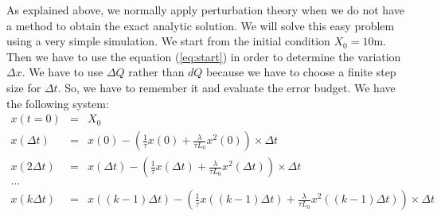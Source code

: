 \documentclass[a4paper,10pt]{article}
\begin{document}
As explained above, we normally apply perturbation theory when we do not have a method to obtain the exact analytic solution. We will solve this easy problem using a very simple simulation. We start from the initial condition $X_0=10$m. Then we have to use the equation (\ref{eq:start}) in order to determine the variation $\Delta x$. We have to use $\Delta Q$ rather than $dQ$ because we have to choose a finite step size for $\Delta t$. So, we have to remember it and evaluate the error budget. We have the following system:
\begin{eqnarray}
x(t=0) &=& X_0\\
x(\Delta t) &=& x(0) - \left(  \frac{1}{\tau}x(0) + \frac{\lambda}{\tau L_0}x^2(0) \right)\times \Delta t\\
x(2\Delta t) &=& x(\Delta t) - \left(  \frac{1}{\tau}x(\Delta t) + \frac{\lambda}{\tau L_0}x^2(\Delta t) \right)\times \Delta t\\
\ldots \\
x(k\Delta t) &=& x( (k-1)\Delta t) - \left(  \frac{1}{\tau}x((k-1)\Delta t) + \frac{\lambda}{\tau L_0}x^2((k-1)\Delta t) \right)\times \Delta t
\end{eqnarray}
\end{document}
